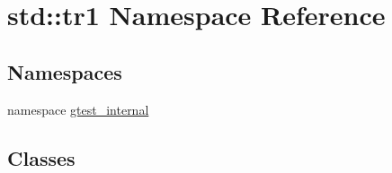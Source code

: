 \hypertarget{namespacestd_1_1tr1}{\section{std\-:\-:tr1 \-Namespace \-Reference}
\label{d2/db7/namespacestd_1_1tr1}
}
\subsection*{\-Namespaces}
\begin{DoxyCompactItemize}
\item 
namespace \hyperlink{namespacestd_1_1tr1_1_1gtest__internal}{gtest\-\_\-internal}
\end{DoxyCompactItemize}
\subsection*{\-Classes}
